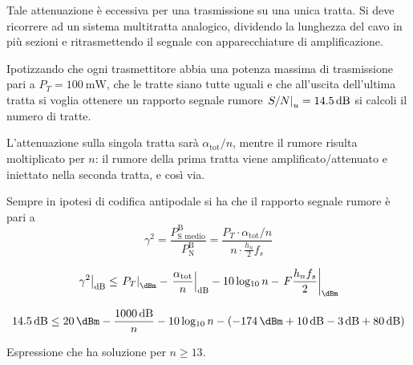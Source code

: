 Tale attenuazione è eccessiva per una trasmissione su una unica tratta. Si deve ricorrere ad un sistema multitratta analogico, dividendo la lunghezza del cavo in più sezioni e ritrasmettendo il segnale con apparecchiature di amplificazione.

Ipotizzando che ogni trasmettitore abbia una potenza massima di trasmissione pari a $P_T=\SI{100}{\milli\watt}$, che le tratte siano tutte uguali e che all'uscita dell'ultima tratta si voglia ottenere un rapporto segnale rumore $\restrict{S/N}{u}=\SI{14.5}{\decibel}$ si calcoli il numero di tratte.

L'attenuazione sulla singola tratta sarà $\alpha_\text{tot}/n$, mentre il rumore risulta moltiplicato per $n$: il rumore della prima tratta viene amplificato/attenuato e iniettato nella seconda tratta, e così via.

Sempre in ipotesi di codifica antipodale si ha che il rapporto segnale rumore è pari a
\[\gamma^2=\frac{P_\text{S medio}^\text{B}}{P_\text{N}^\text{B}}=\frac{P_T\cdot\alpha_\text{tot}/n}{n\cdot\frac{h_n}{2}f_s}\]

\[\restrict{\gamma^2}{\si{\decibel}}\leq \restrict{P_T}{\si{\dBm}} - \restrict{\frac{\alpha_\text{tot}}{n}}{\si{\decibel}}-10\Log{n}-\restrict{F\frac{h_n f_s}{2}}{\si{\dBm}}\]

\[ \SI{14.5}{\decibel}\leq\SI{20}{\dBm} - \frac{\SI{1000}{\decibel}}{n}-10\Log{n}-(-\SI{174}{\dBm}+\SI{10}{\decibel}-\SI{3}{\decibel}+\SI{80}{\decibel})\]

Espressione che ha soluzione per $n\geq 13$.

\begin{figure}[ht!]\centering
{}\quad%
\end{figure}

